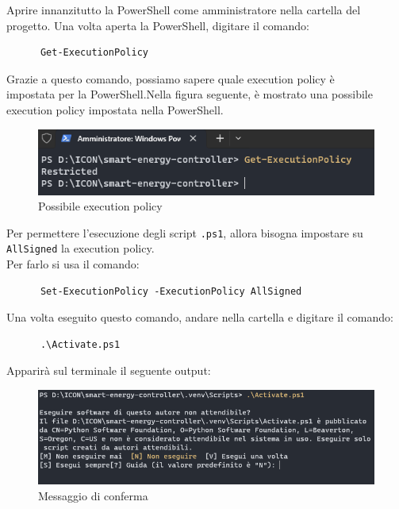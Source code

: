 \documentclass[12pt, letterpaper]{article}
\begin{document}
\begin{appendices}
      \noindent Aprire innanzitutto la PowerShell come amministratore nella cartella del progetto.
      Una volta aperta la PowerShell, digitare il comando: \\

      \begin{verbatim}
      Get-ExecutionPolicy
\end{verbatim}

      \noindent Grazie a questo comando, possiamo sapere quale execution policy è \\
      impostata per la PowerShell.Nella figura seguente, è mostrato una
      possibile execution policy impostata nella PowerShell. \\

      \begin{figure}[h]
            \centering
            \includegraphics{powershell-error.png}
            \caption{Possibile execution policy}
      \end{figure}

      \noindent Per permettere l'esecuzione degli script \texttt{.ps1}, allora bisogna impostare
      su \texttt{AllSigned} la execution policy. \\
      \noindent Per farlo si usa il comando: \\

      \begin{verbatim}
      Set-ExecutionPolicy -ExecutionPolicy AllSigned
\end{verbatim}

      \noindent Una volta eseguito questo comando, andare nella
      cartella  e digitare il comando: \\

      \begin{verbatim}
      .\Activate.ps1
      \end{verbatim}


      \noindent Apparirà sul terminale il seguente output:

      \begin{figure}[h]
            \centering
            \includegraphics[scale=0.6]{terminal-message.png}
            \caption{Messaggio di conferma}
      \end{figure}


\end{appendices}
\end{document}
